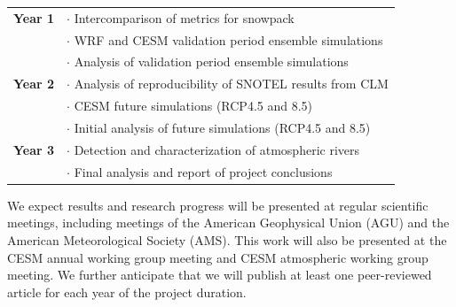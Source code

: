 \documentclass[11pt]{article}
\begin{document}
\begin{tabularx}{\textwidth}{cX}
\hline
\textbf{Year 1} & $\cdot$ Intercomparison of metrics for snowpack \\
& $\cdot$ WRF and CESM validation period ensemble simulations \\
& $\cdot$ Analysis of validation period ensemble simulations \\
\hline
\textbf{Year 2} & $\cdot$ Analysis of reproducibility of SNOTEL results from CLM \\
& $\cdot$ CESM future simulations (RCP4.5 and 8.5) \\
& $\cdot$ Initial analysis of future simulations (RCP4.5 and 8.5) \\
\hline
\textbf{Year 3} & $\cdot$ Detection and characterization of atmospheric rivers \\
& $\cdot$ Final analysis and report of project conclusions \\
\hline
\end{tabularx}

We expect results and research progress will be presented at regular scientific meetings, including meetings of the American Geophysical Union (AGU) and the American Meteorological Society (AMS). This work will also be presented at the CESM annual working group meeting and CESM atmospheric working group meeting. We further anticipate that we will publish at least one peer-reviewed article for each year of the project duration.

  
{\vbox{}}
\end{document}

